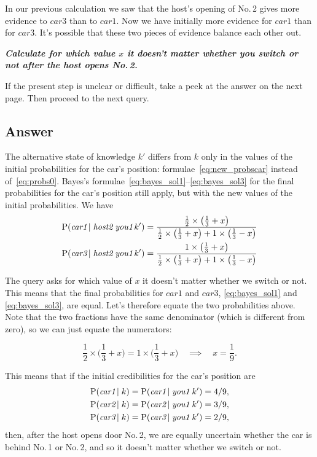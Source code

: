 \documentclass[\ifafour a4paper,12pt,\else a5paper,10pt,\fi%
onecolumn,oneside,article,%
british%
]{memoir}
\theoremstyle{remark}
\theoremstyle{innote}
\newcommand{\addsubsec}[1]{\subsection*{#1}\addcontentsline{toc}{subsection}{#1}}
\newcommand*{\p}{\mathrm{P}}%
\renewcommand*{\|}{\nonscript\,\vert\nonscript\;\mathopen{}}
\newcommand*{\cara}{\textit{car1}}
\newcommand*{\carb}{\textit{car2}}
\newcommand*{\carc}{\textit{car3}}
\newcommand*{\hostb}{\textit{host2}}
\newcommand*{\youa}{\textit{you1}}
\newcommand*{\quest}[1]{\emph{\textbf{\color{mygreen}#1}}}
\begin{document}
In our previous calculation we saw that the host's opening of No.\,2 gives
more evidence to $\carc$ than to $\cara$. Now we have initially more
evidence for $\cara$ than for $\carc$. It's possible that these two pieces
of evidence balance each other out.

\medskip

\quest{Calculate for which value $x$ it doesn't matter whether you switch
  or not after the host opens No.\,2.}

\medskip

If the present step is unclear or difficult, take a peek at the answer on
the next page. Then proceed to the next query.

\clearpage

\addsubsec{Answer}

The alternative state of knowledge $k'$ differs from $k$ only in the values
of the initial probabilities for the car's position:
formulae~\eqref{eq:new_probscar} instead of~\eqref{eq:probs0}. Bayes's
formulae~\eqref{eq:bayes_sol1}--\eqref{eq:bayes_sol3} for the final
probabilities for the car's position still apply, but with the new values
of the initial probabilities. We have
\begin{align}
  &\p(\cara\|\hostb\;\youa\,k') =
    \frac{ \frac{1}{2} \times \bigl( \frac{1}{3} +x \bigr) }{
    \frac{1}{2} \times \bigl( \frac{1}{3} +x \bigr) +
    1 \times \bigl( \frac{1}{3} -x \bigr)}
  \\
  &\p(\carc\|\hostb\;\youa\,k') =
    \frac{ 1 \times \bigl( \frac{1}{3} +x \bigr) }{
    \frac{1}{2} \times \bigl( \frac{1}{3} +x \bigr) +
    1 \times \bigl( \frac{1}{3} -x \bigr)}
\end{align}

The query asks for which value of $x$ it doesn't matter whether we switch
or not. This means that the final probabilities for $\cara$ and $\carc$,
\eqref{eq:bayes_sol1} and \eqref{eq:bayes_sol3}, are equal. Let's therefore
equate the two probabilities above. Note that the two fractions have the
same denominator (which is different from zero), so we can just equate the
numerators:
\begin{snugshade}
\begin{equation}
  \label{eq:equate_prob1}
  \frac{1}{2} \times \biggl( \frac{1}{3} +x \biggr) =
  1 \times \biggl( \frac{1}{3} +x \biggr)
  \quad\implies\quad
  x=\frac{1}{9}.
\end{equation}
\end{snugshade}
This means that if the initial credibilities for the car's position are
\begin{equation}
  \label{eq:new_probscar_equal}
    \begin{split}
    &\p(\cara \|k) = \p(\cara\|\youa\;k') = 4/9,\\
    &\p(\carb \|k) = \p(\carb\|\youa\;k') = 3/9,\\
    &\p(\carc \|k) = \p(\carc\|\youa\;k') = 2/9,
  \end{split}
\end{equation}
then, after the host opens door No.\,2, we are equally uncertain whether
the car is behind No.\,1 or No.\,2, and so it doesn't matter whether we
switch or not.
\end{document}
